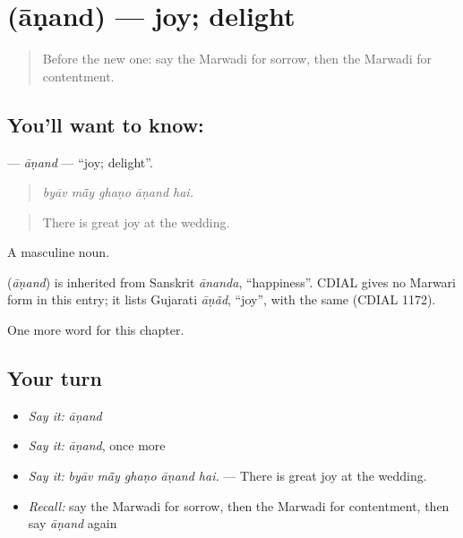 \section[\texorpdfstring{\mw{आणंद} (āṇand)}{आणंद (āṇand)}]{ (āṇand) — joy; delight}

\label{lesson:MW-C256-anand}



\begin{quote}
Before the new one: say the Marwadi for sorrow, then the Marwadi for contentment.
\end{quote}

\subsection*{You'll want to know: }
\textbf{} — \emph{āṇand} — \textquotedblleft{}joy; delight\textquotedblright{}.

\begin{quote}
    
\end{quote}

\begin{quote}
\emph{byāv mā̃y ghaṇo āṇand hai.}
\end{quote}

\begin{quote}
There is great joy at the wedding.
\end{quote}

A masculine noun.

\begin{cousinweb}
\textbf{} (\emph{āṇand}) is inherited from Sanskrit \emph{ānanda}, \textquotedblleft{}happiness\textquotedblright{}. CDIAL gives no Marwari form in this entry; it lists Gujarati \emph{āṇãd}, \textquotedblleft{}joy\textquotedblright{}, with the same  (CDIAL 1172).
\end{cousinweb}

\begin{grammarlens}[title={What you've built}]
One more word for this chapter.
\end{grammarlens}

\subsection*{Your turn}
\begin{itemize}
\raggedright
  \item \emph{Say it:} \emph{āṇand}
  \item \emph{Say it:} \emph{āṇand}, once more
  \item \emph{Say it:} \emph{byāv mā̃y ghaṇo āṇand hai.} — There is great joy at the wedding.
  \item \emph{Recall:} say the Marwadi for sorrow, then the Marwadi for contentment, then say \emph{āṇand} again
\end{itemize}

